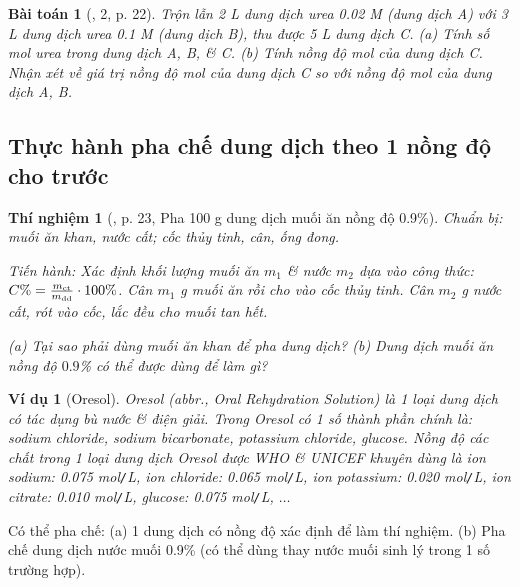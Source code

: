 \documentclass{article}
\newtheorem{baitoan}{Bài toán}
\newtheorem{thinghiem}{Thí nghiệm}
\newtheorem{vidu}{Ví dụ}
\begin{document}
\begin{baitoan}[\cite{SGK_KHTN_8_KNTTVCS}, 2, p. 22]
	Trộn lẫn \emph{2 L} dung dịch urea \emph{0.02 M} (dung dịch A) với \emph{3 L} dung dịch urea \emph{0.1 M} (dung dịch B), thu được \emph{5 L} dung dịch C. (a) Tính số mol urea trong dung dịch A, B, \& C. (b) Tính nồng độ mol của dung dịch C. Nhận xét về giá trị nồng độ mol của dung dịch C so với nồng độ mol của dung dịch A, B.
\end{baitoan}

\subsection{Thực hành pha chế dung dịch theo 1 nồng độ cho trước}

\begin{thinghiem}[\cite{SGK_KHTN_8_KNTTVCS}, p. 23, Pha 100 g dung dịch muối ăn nồng độ 0.9\%]
	\emph{Chuẩn bị:} muối ăn khan, nước cất; cốc thủy tinh, cân, ống đong.
	
	\emph{Tiến hành:} Xác định khối lượng muối ăn $m_1$ \& nước $m_2$ dựa vào công thức: $C\% = \frac{m_{\rm ct}}{m_{\rm dd}}\cdot100\%$. Cân $m_1$ g muối ăn rồi cho vào cốc thủy tinh. Cân $m_2$ g nước cất, rót vào cốc, lắc đều cho muối tan hết.
	
	(a) Tại sao phải dùng muối ăn khan để pha dung dịch? (b) Dung dịch muối ăn nồng độ $0.9$\% có thể được dùng để làm gì?
\end{thinghiem}

\begin{vidu}[Oresol]
	\emph{Oresol} (abbr., Oral Rehydration Solution) là 1 loại dung dịch có tác dụng bù nước \& điện giải. Trong Oresol có 1 số thành phần chính là: sodium chloride, sodium bicarbonate, potassium chloride, glucose. Nồng độ các chất trong 1 loại dung dịch Oresol được WHO \& UNICEF khuyên dùng là \emph{ion sodium: 0.075 mol\texttt{/}L, ion chloride: 0.065 mol\texttt{/}L, ion potassium: 0.020 mol\texttt{/}L, ion citrate: 0.010 mol\texttt{/}L, glucose: 0.075 mol\texttt{/}L, $\ldots$}
\end{vidu}
Có thể pha chế: (a) 1 dung dịch có nồng độ xác định để làm thí nghiệm. (b)  Pha chế dung dịch nước muối 0.9\% (có thể dùng thay nước muối sinh lý trong 1 số trường hợp).
\end{document}
